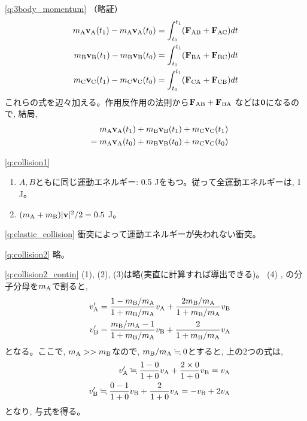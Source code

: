 \ref{q:3body_momentum}
（略証）
\begin{eqnarray*}
m_{\text A}{\bf v}_{\text A}(t_1)-m_{\text A}{\bf v}_{\text A}(t_0)=\int_{t_0}^{t_1}({\bf F}_{\text {AB}}+{\bf F}_{\text {AC}})dt\\
m_{\text B}{\bf v}_{\text B}(t_1)-m_{\text B}{\bf v}_{\text B}(t_0)=\int_{t_0}^{t_1}({\bf F}_{\text {BA}}+{\bf F}_{\text {BC}})dt\\
m_{\text C}{\bf v}_{\text C}(t_1)-m_{\text C}{\bf v}_{\text C}(t_0)=\int_{t_0}^{t_1}({\bf F}_{\text {CA}}+{\bf F}_{\text {CB}})dt
\end{eqnarray*}
これらの式を辺々加える。作用反作用の法則から${\bf F}_{\text {AB}}+{\bf F}_{\text {BA}}$
などは${\bf 0}$になるので, 結局, 
\begin{eqnarray*}
&&m_{\text A}{\bf v}_{\text A}(t_1)+m_{\text B}{\bf v}_{\text B}(t_1)+m_{\text C}{\bf v}_{\text C}(t_1)\\
&&=m_{\text A}{\bf v}_{\text A}(t_0)+m_{\text B}{\bf v}_{\text B}(t_0)+m_{\text C}{\bf v}_{\text C}(t_0)
\end{eqnarray*}

% 
\ref{q:collision1}
\begin{enumerate}
\item $A, B$ともに同じ運動エネルギー: 0.5 Jをもつ。従って全運動エネルギーは, 1 J。
\item $(m_{\text A}+m_{\text B})|{\bf v}|^2/2=0.5$ J。
\end{enumerate}

\ref{q:elastic_collision}
衝突によって運動エネルギーが失われない衝突。

\ref{q:collision2} 略。

\ref{q:collision2_contin}
(1), (2), (3)は略(実直に計算すれば導出できる)。\mv
(4) , の分子分母を$m_{\text A}$で割ると, 
\begin{eqnarray*}
&&v'_{\text A}=\frac{1-m_{\text B}/m_{\text A}}{1+m_{\text B}/m_{\text A}}v_{\text A}+\frac{2m_{\text B}/m_{\text A}}{1+m_{\text B}/m_{\text A}}v_{\text B}\\
&&v'_{\text B}=\frac{m_{\text B}/m_{\text A}-1}{1+m_{\text B}/m_{\text A}}v_{\text B}+\frac{2}{1+m_{\text B}/m_{\text A}}v_{\text A}
\end{eqnarray*}
となる。ここで, $m_{\text A}>>m_{\text B}$なので, $m_{\text B}/m_{\text A}\fallingdotseq0$とすると, 上の2つの式は, 
\begin{eqnarray*}
&&v'_{\text A}\fallingdotseq \frac{1-0}{1+0}v_{\text A}+\frac{2\times0}{1+0}v_{\text B}=v_{\text A}\\
&&v'_{\text B}\fallingdotseq \frac{0-1}{1+0}v_{\text B}+\frac{2}{1+0}v_{\text A}=-v_{\text B}+2v_{\text A}
\end{eqnarray*}
となり, 与式を得る。
\vspace{0.2cm}


